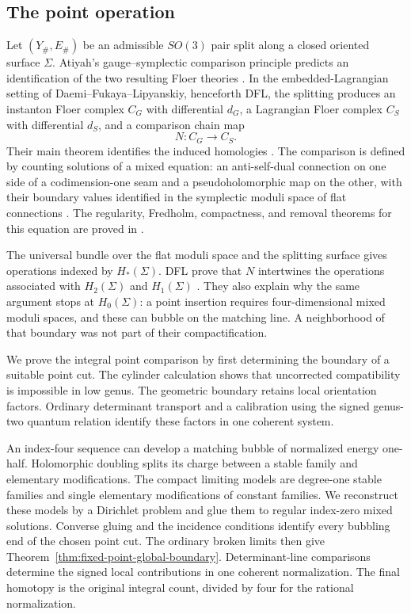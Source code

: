 \documentclass[11pt]{amsart}
\theoremstyle{definition}
\theoremstyle{remark}
\theoremstyle{plain}
\begin{document}
\subsection{The point operation}
Let $(Y_\#,E_\#)$ be an admissible $SO(3)$ pair split along a closed
oriented surface $\Sigma$.  Atiyah's gauge--symplectic comparison
principle predicts an identification of the two resulting Floer theories
\cite{Atiyah88}.  In the embedded-Lagrangian setting of
Daemi--Fukaya--Lipyanskiy, henceforth DFL, the splitting produces an
instanton Floer complex $C_G$ with differential $d_G$, a Lagrangian Floer
complex $C_S$ with differential $d_S$, and a comparison chain map
\[
                     N:C_G\longrightarrow C_S.
\]
Their main theorem identifies the induced homologies
\cite[Theorem~2]{DaeFukLip21a}.  The comparison is defined by counting
solutions of a mixed equation: an anti-self-dual connection on one side
of a codimension-one seam and a pseudoholomorphic map on the other, with
their boundary values identified in the symplectic moduli space of flat
connections \cite{AtiyahBott83}.
The regularity, Fredholm, compactness, and removal theorems for this
equation are proved in \cite{DaeFukLip21b}.

The universal bundle over the flat moduli space and the splitting surface
gives operations indexed by $H_*(\Sigma)$.  DFL prove that $N$
intertwines the operations associated with $H_2(\Sigma)$ and
$H_1(\Sigma)$ \cite[Section~7.2]{DaeFukLip21a}.  They also explain why
the same argument stops at $H_0(\Sigma)$: a point insertion requires
four-dimensional mixed moduli spaces, and these can bubble on the
matching line.  A neighborhood of that boundary was not part of their
compactification.

We prove the integral point comparison by first determining the boundary
of a suitable point cut. The cylinder calculation shows that uncorrected
compatibility is impossible in low genus. The geometric boundary retains
local orientation factors. Ordinary determinant transport and a
calibration using the signed genus-two quantum relation identify
these factors in one coherent system.

An index-four sequence can develop a matching bubble of normalized
energy one-half. Holomorphic doubling splits its charge between
a stable family and elementary modifications. The compact
limiting models are degree-one stable families and single
elementary modifications of constant families.
We reconstruct these models by a Dirichlet problem
and glue them to regular index-zero mixed solutions. Converse
gluing and the incidence conditions identify every bubbling end
of the chosen point cut. The ordinary broken limits then give
Theorem~\ref{thm:fixed-point-global-boundary}. Determinant-line
comparisons determine the signed local contributions in one
coherent normalization. The final homotopy is the original
integral count, divided by four for the rational normalization.
\end{document}
